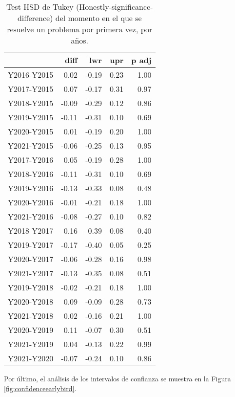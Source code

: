 \begin{table}[H]
\centering
\caption{Test HSD de Tukey (Honestly-significance-difference) del momento en el que se resuelve un problema por primera vez, por años.}
\label{tab:Tukeyearlybird}
\begin{tabular}{rrrrr}
  \hline
 & diff & lwr & upr & p adj \\ 
  \hline
Y2016-Y2015 & 0.02 & -0.19 & 0.23 & 1.00 \\ 
  Y2017-Y2015 & 0.07 & -0.17 & 0.31 & 0.97 \\ 
  Y2018-Y2015 & -0.09 & -0.29 & 0.12 & 0.86 \\ 
  Y2019-Y2015 & -0.11 & -0.31 & 0.10 & 0.69 \\ 
  Y2020-Y2015 & 0.01 & -0.19 & 0.20 & 1.00 \\ 
  Y2021-Y2015 & -0.06 & -0.25 & 0.13 & 0.95 \\ 
  Y2017-Y2016 & 0.05 & -0.19 & 0.28 & 1.00 \\ 
  Y2018-Y2016 & -0.11 & -0.31 & 0.10 & 0.69 \\ 
  Y2019-Y2016 & -0.13 & -0.33 & 0.08 & 0.48 \\ 
  Y2020-Y2016 & -0.01 & -0.21 & 0.18 & 1.00 \\ 
  Y2021-Y2016 & -0.08 & -0.27 & 0.10 & 0.82 \\ 
  Y2018-Y2017 & -0.16 & -0.39 & 0.08 & 0.40 \\ 
  Y2019-Y2017 & -0.17 & -0.40 & 0.05 & 0.25 \\ 
  Y2020-Y2017 & -0.06 & -0.28 & 0.16 & 0.98 \\ 
  Y2021-Y2017 & -0.13 & -0.35 & 0.08 & 0.51 \\ 
  Y2019-Y2018 & -0.02 & -0.21 & 0.18 & 1.00 \\ 
  Y2020-Y2018 & 0.09 & -0.09 & 0.28 & 0.73 \\ 
  Y2021-Y2018 & 0.02 & -0.16 & 0.21 & 1.00 \\ 
  Y2020-Y2019 & 0.11 & -0.07 & 0.30 & 0.51 \\ 
  Y2021-Y2019 & 0.04 & -0.13 & 0.22 & 0.99 \\ 
  Y2021-Y2020 & -0.07 & -0.24 & 0.10 & 0.86 \\ 
   \hline
\end{tabular}
\end{table}

Por último, el análisis de los intervalos de confianza se muestra en la Figura \ref{fig:confidenceearlybird}.

